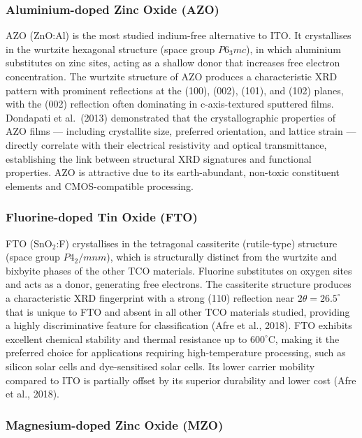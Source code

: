 \documentclass[12pt, oneside]{article} %
\begin{document}
\subsubsection{Aluminium-doped Zinc Oxide (AZO)}

AZO (ZnO:Al) is the most studied indium-free alternative to ITO. It crystallises in the wurtzite hexagonal structure (space group $P6_3mc$), in which aluminium substitutes on zinc sites, acting as a shallow donor that increases free electron concentration. The wurtzite structure of AZO produces a characteristic XRD pattern with prominent reflections at the (100), (002), (101), and (102) planes, with the (002) reflection often dominating in c-axis-textured sputtered films. Dondapati et al.\ (2013) demonstrated that the crystallographic properties of AZO films --- including crystallite size, preferred orientation, and lattice strain --- directly correlate with their electrical resistivity and optical transmittance, establishing the link between structural XRD signatures and functional properties. AZO is attractive due to its earth-abundant, non-toxic constituent elements and CMOS-compatible processing.


\subsubsection{Fluorine-doped Tin Oxide (FTO)}

FTO ($\text{SnO}_2$:F) crystallises in the tetragonal cassiterite (rutile-type) structure (space group $P4_2/mnm$), which is structurally distinct from the wurtzite and bixbyite phases of the other TCO materials. Fluorine substitutes on oxygen sites and acts as a donor, generating free electrons. The cassiterite structure produces a characteristic XRD fingerprint with a strong (110) reflection near $2\theta = 26.5^{\circ}$ that is unique to FTO and absent in all other TCO materials studied, providing a highly discriminative feature for classification (Afre et al., 2018). FTO exhibits excellent chemical stability and thermal resistance up to $600^{\circ}$C, making it the preferred choice for applications requiring high-temperature processing, such as silicon solar cells and dye-sensitised solar cells. Its lower carrier mobility compared to ITO is partially offset by its superior durability and lower cost (Afre et al., 2018).


\subsubsection{Magnesium-doped Zinc Oxide (MZO)}
\end{document}
